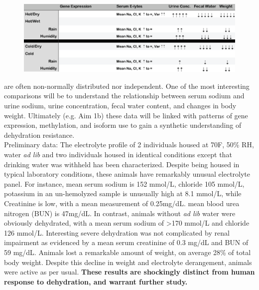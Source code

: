 \documentclass[11pt]{article}
\begin{document}
\begin{figure}
\hypertarget{Table 1}{}
\vspace{-5mm}
\begin{mdframed}
  \begin{center}
    \includegraphics[width=1\textwidth]{Aim1-table.eps}
  \end{center}
\end{mdframed}
\end{figure}

\noindent are often non-normally distributed nor independent. One of the most interesting comparisons will be to understand the relationship between serum sodium and urine sodium, urine concentration, fecal water content, and changes in body weight. Ultimately (e.g. Aim 1b) these data will be linked with patterns of gene expression, methylation, and isoform use to gain a synthetic understanding of dehydration resistance. \\




%
%


Preliminary data: The electrolyte profile of 2 individuals housed at 70F, 50\% RH, water \textit{ad lib} and two individuals housed in identical conditions except that drinking water was withheld has been characterized. Despite being housed in typical laboratory conditions, these animals have remarkably unusual electrolyte panel. For instance, mean serum sodium is 152 mmol/L, chloride 105 mmol/L, potassium in an un-hemolyzed sample is unusually high at 8.1 mmol/L, while Creatinine is low, with a mean measurement of 0.25mg/dL. mean blood urea nitrogen (BUN) is 47mg/dL. In contrast, animals without \textit{ad lib} water were obviously dehydrated, with a mean serum sodium of \textgreater 170 mmol/L and chloride 126 mmol/L. Interesting severe dehydration was not complicated by renal impairment as evidenced by a mean serum creatinine of 0.3 mg/dL and BUN of 59 mg/dL. Animals lost a remarkable amount of weight, on average 28\% of total body weight. Despite this decline in weight and electrolyte derangement, animals were active as per usual. \textbf{These results are shockingly distinct from human response to dehydration, and warrant further study.}  \\  
\end{document}
